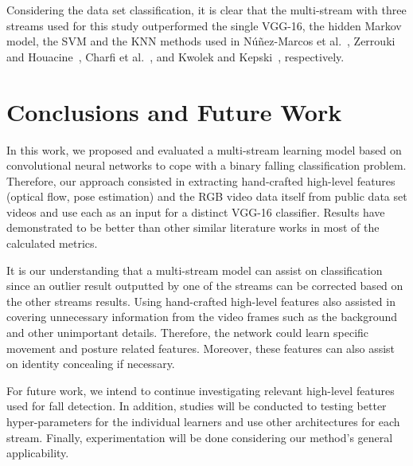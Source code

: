 \documentclass{article}
\begin{document}
Considering the data set classification, it is clear that the multi-stream with three streams used for this study outperformed the single VGG-16, the hidden Markov model, the SVM and the KNN methods used in N\'u\~nez-Marcos et al.~\cite{nunez2017vision}, Zerrouki and Houacine~\cite{zerrouki2018combined}, Charfi et al.~\cite{charfi2012definition}, and Kwolek and Kepski~\cite{kwolek2015improving}, respectively.

\section{Conclusions and Future Work}
\label{sec:conclusion}

In this work, we proposed and evaluated a multi-stream learning model based on convolutional neural networks to cope with a binary falling classification problem. Therefore, our approach consisted in extracting hand-crafted high-level features (optical flow, pose estimation) and the RGB video data itself from public data set videos and use each as an input for a distinct VGG-16 classifier. Results have demonstrated to be better than other similar literature works in most of the calculated metrics. 

It is our understanding that a multi-stream model can assist on classification since an outlier result outputted by one of the streams can be corrected based on the other streams results. Using hand-crafted high-level features also assisted in covering unnecessary information from the video frames such as the background and other unimportant details. Therefore, the network could learn specific movement and posture related features. Moreover, these features can also assist on identity concealing if necessary.

For future work, we intend to continue investigating relevant high-level features used for fall detection. In addition, studies will be conducted to testing better hyper-parameters for the individual learners and use other architectures for each stream. Finally, experimentation will be done considering our method's general applicability.



\end{document}
